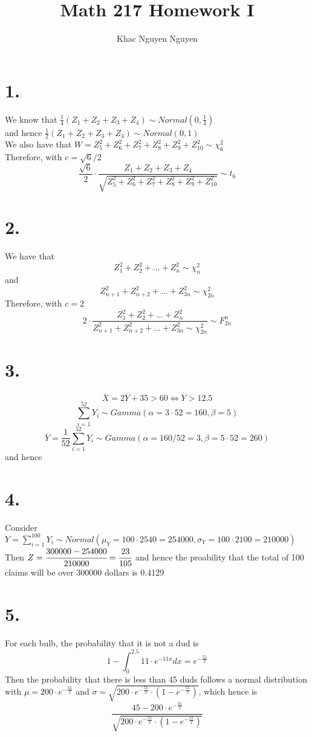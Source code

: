 \documentclass[11pt]{article}
\title{\textbf{Math 217 Homework I}}
\author{Khac Nguyen Nguyen}
\date{}
\begin{document}
\section*{1.}
We know that $\frac{1}{4} \left(Z_1 + Z_2 + Z_3 + Z_4\right) \sim Normal(0,\frac{1}{4})$ \\
and hence $\frac{1}{2} \left(Z_1 + Z_2 + Z_3 + Z_4\right) \sim Normal(0,1)$ \\
We also have that $W=Z_5^2 + Z_6^2 + Z_7^2 + Z_8^2 + Z_9^2 + Z_{10}^2 \sim \chi_6^2$ \\
Therefore, with $c=\sqrt{6}/2$
\[
    \frac{\sqrt{6}}{2}\cdot \frac{Z_1 + Z_2 + Z_3 + Z_4}{\sqrt{Z_5^2 + Z_6^2 + Z_7^2 + Z_8^2 + Z_9^2 + Z_{10}^2}} \sim t_6    
\]
\pagebreak
\section*{2.}
We have that 
\[
    Z_1^2 + Z_2^2 + \ldots + Z_n^2 \sim \chi^2_{n}
\]
and 
\[
    Z_{n+1}^2 + Z_{n+2}^2 + \ldots + Z_{3n}^2 \sim \chi^2_{2n}
\]
Therefore, with $c=2$
\[
    2 \cdot \frac{Z_1^2 + Z_2^2 + \ldots + Z_n^2}{Z_{n+1}^2 + Z_{n+2}^2 + \ldots + Z_{3n}^2 \sim \chi^2_{2n}} \sim F_{2n}^n
\]
\pagebreak
\section*{3.}
\[
    \overline{X} = 2\overline{Y} + 35 > 60 \iff \overline{Y} > 12.5    
\]
\[
    \sum_{i=1}^{52} Y_i \sim Gamma(\alpha = 3 \cdot 52 = 160, \beta = 5)
\]
\[
    \overline{Y} = \frac{1}{52} \sum_{i=1}^{52} Y_i \sim Gamma(\alpha = 160/52=3, \beta = 5\cdot52 = 260)
\]
and hence
\pagebreak
\section*{4.}
Consider $Y = \sum_{i=1}^{100} Y_i \sim Normal(\mu_Y = 100 \cdot 2540 = 254000, \sigma_Y = 100 \cdot 2100 = 210000)$ 
Then $Z = \cfrac{300000-254000}{210000}  = \cfrac{23}{105}$ and hence the proability that the total of 100 claims will be over 300000 dollars is 0.4129
\pagebreak
\section*{5.}
For each bulb, the probability that it is not a dud is 
\[
    1 - \int_0^{2.5} 11 \cdot e^{-11x} dx  = e^{- \frac{55}{2}}
\]
Then the probability that there is less than 45 duds follows a normal distribution with $\mu = 200 \cdot e^{- \frac{55}{2}}$
and $\sigma = \sqrt{200 \cdot e^{- \frac{55}{2}} \cdot (1-e^{- \frac{55}{2}})}$, which hence is 
\[
    \frac{45-200 \cdot e^{- \frac{55}{2}}}{\sqrt{200 \cdot e^{- \frac{55}{2}} \cdot (1-e^{- \frac{55}{2}})}}
\]
\pagebreak
\end{document}
